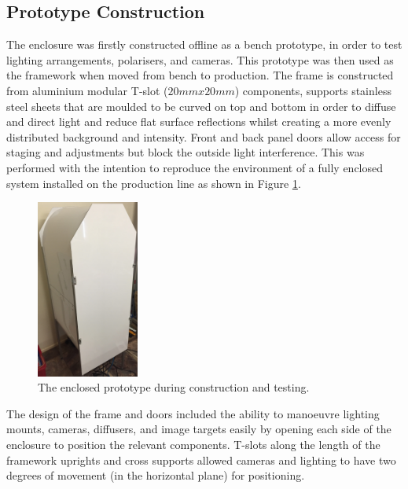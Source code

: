 \documentclass[fleqn,twoside,12pt]{report}
\begin{document}
\subsection{Prototype Construction}
\label{sec:prototype_contruct}


The enclosure was firstly constructed offline as a bench prototype, in order to test lighting arrangements, polarisers, and cameras. This prototype was then used as the framework when moved from bench to production. The frame is constructed from aluminium modular T-slot ($20mmx20mm$) components, supports stainless steel sheets that are moulded to be curved on top and bottom in order to diffuse and direct light and reduce flat surface reflections whilst creating a more evenly distributed background and intensity. Front and back panel doors allow access for staging and adjustments but block the outside light interference. This was performed with the intention to reproduce the environment of a fully enclosed system installed on the production line as shown in Figure \ref{fig:bench_construct}. 

\begin{figure}
	\begin{center}
		\includegraphics[width=0.3\textwidth]{images/bench_construct.jpg}
	\end{center}
	\caption{The enclosed prototype during construction and testing.}
	\label{fig:bench_construct}
\end{figure} 

 

The design of the frame and doors included the ability to manoeuvre lighting mounts, cameras, diffusers, and image targets easily by opening each side of the enclosure to position the relevant components. T-slots along the length of the framework uprights and cross supports allowed cameras and lighting to have two degrees of movement (in the horizontal plane) for positioning. 
\end{document}
